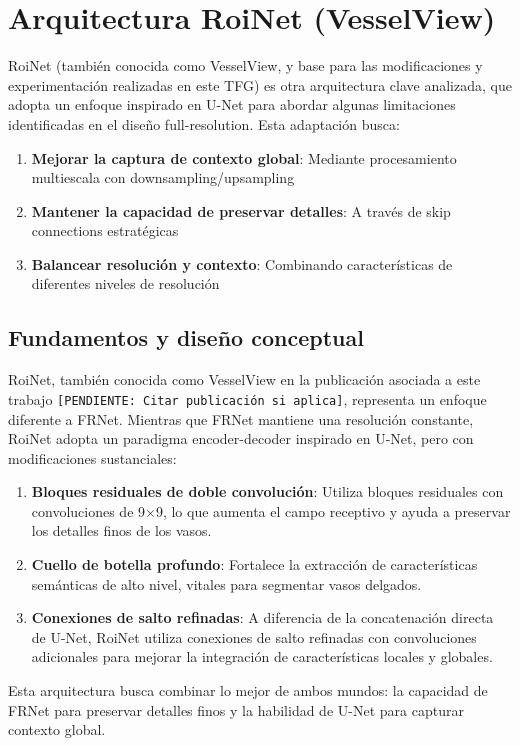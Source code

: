 \documentclass[11pt,a4paper]{report} %
\begin{document}
\section{Arquitectura RoiNet (VesselView)}
RoiNet (también conocida como VesselView, y base para las modificaciones y experimentación realizadas en este TFG) es otra arquitectura clave analizada, que adopta un enfoque inspirado en U-Net para abordar algunas limitaciones identificadas en el diseño full-resolution. Esta adaptación busca:
\begin{enumerate}
  \item \textbf{Mejorar la captura de contexto global}: Mediante procesamiento multiescala con downsampling/upsampling
  \item \textbf{Mantener la capacidad de preservar detalles}: A través de skip connections estratégicas
  \item \textbf{Balancear resolución y contexto}: Combinando características de diferentes niveles de resolución
\end{enumerate}

\subsection{Fundamentos y diseño conceptual}
RoiNet, también conocida como VesselView en la publicación asociada a este trabajo \texttt{[PENDIENTE: Citar publicación si aplica]}, representa un enfoque diferente a FRNet. Mientras que FRNet mantiene una resolución constante, RoiNet adopta un paradigma encoder-decoder inspirado en U-Net, pero con modificaciones sustanciales:
\begin{enumerate}
  \item \textbf{Bloques residuales de doble convolución}: Utiliza bloques residuales con convoluciones de 9×9, lo que aumenta el campo receptivo y ayuda a preservar los detalles finos de los vasos.
  \item \textbf{Cuello de botella profundo}: Fortalece la extracción de características semánticas de alto nivel, vitales para segmentar vasos delgados.
  \item \textbf{Conexiones de salto refinadas}: A diferencia de la concatenación directa de U-Net, RoiNet utiliza conexiones de salto refinadas con convoluciones adicionales para mejorar la integración de características locales y globales.
\end{enumerate}
Esta arquitectura busca combinar lo mejor de ambos mundos: la capacidad de FRNet para preservar detalles finos y la habilidad de U-Net para capturar contexto global.
\end{document}
